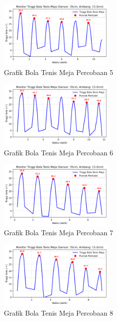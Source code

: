 \begin{figure}[htbp]
    \centering
    \includegraphics[width=0.5\textwidth]{chapters/DataPercobaan/Grafik_Bola_Tenis_Meja_5.png}
    \caption{Grafik Bola Tenis Meja Percobaan 5}
\end{figure}
\begin{figure}[htbp]
    \centering
    \includegraphics[width=0.5\textwidth]{chapters/DataPercobaan/Grafik_Bola_Tenis_Meja_6.png}
    \caption{Grafik Bola Tenis Meja Percobaan 6}
\end{figure}
\begin{figure}[htbp]
    \centering
    \includegraphics[width=0.5\textwidth]{chapters/DataPercobaan/Grafik_Bola_Tenis_Meja_7.png}
    \caption{Grafik Bola Tenis Meja Percobaan 7}
\end{figure}
\begin{figure}[htbp]
    \centering
    \includegraphics[width=0.5\textwidth]{chapters/DataPercobaan/Grafik_Bola_Tenis_Meja_8.png}
    \caption{Grafik Bola Tenis Meja Percobaan 8}
\end{figure}
